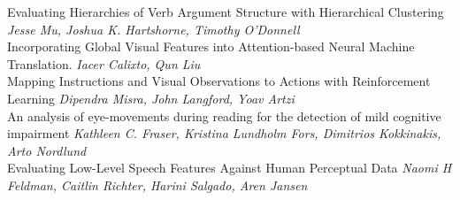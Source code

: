\documentclass{book}
\begin{document}
    \noindent	Evaluating Hierarchies of Verb Argument Structure with Hierarchical Clustering \newline 
    {\itshape Jesse Mu, Joshua K. Hartshorne, Timothy O'Donnell} \\
    
    \noindent	Incorporating Global Visual Features into Attention-based Neural Machine Translation. \newline 
    {\itshape Iacer Calixto, Qun Liu} \\
    
    \noindent	Mapping Instructions and Visual Observations to Actions with Reinforcement Learning \newline 
    {\itshape Dipendra Misra, John Langford, Yoav Artzi} \\
    
    \noindent	An analysis of eye-movements during reading for the detection of mild cognitive impairment \newline 
    {\itshape Kathleen C. Fraser, Kristina Lundholm Fors, Dimitrios Kokkinakis, Arto Nordlund} \\
    
    \noindent	Evaluating Low-Level Speech Features Against Human Perceptual Data \newline 
    {\itshape Naomi H Feldman, Caitlin Richter, Harini Salgado, Aren Jansen} \\
    
\end{document}
